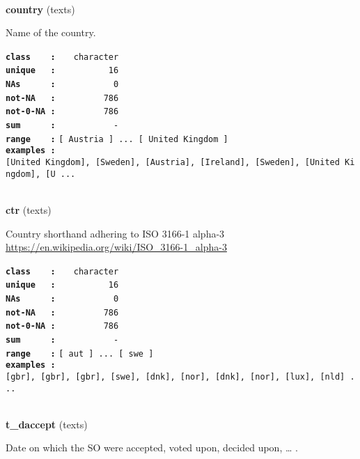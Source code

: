 \documentclass[]{article}
\begin{document}
~

\textbf{country} (texts)

Name of the country.

\textbf{\texttt{class\ \ \ \ :}} \texttt{~~~character}\\
\textbf{\texttt{unique\ \ \ :}} \texttt{~~~~~~~~~~16}\\
\textbf{\texttt{NAs\ \ \ \ \ \ :}} \texttt{~~~~~~~~~~~0}\\
\textbf{\texttt{not-NA\ \ \ :}} \texttt{~~~~~~~~~786}\\
\textbf{\texttt{not-0-NA\ :}} \texttt{~~~~~~~~~786}\\
\textbf{\texttt{sum\ \ \ \ \ \ :}} \texttt{~~~~~~~~~~~-}\\
\textbf{\texttt{range\ \ \ \ :}}
\texttt{{[}\ Austria\ {]}\ ...\ {[}\ United\ Kingdom\ {]}}\\
\textbf{\texttt{examples\ :}}
\texttt{{[}United\ Kingdom{]},\ {[}Sweden{]},\ {[}Austria{]},\ {[}Ireland{]},\ {[}Sweden{]},\ {[}United\ Kingdom{]},\ {[}U\ ...}\\

~

\textbf{ctr} (texts)

Country shorthand adhering to ISO 3166-1 alpha-3
\url{https://en.wikipedia.org/wiki/ISO_3166-1_alpha-3}

\textbf{\texttt{class\ \ \ \ :}} \texttt{~~~character}\\
\textbf{\texttt{unique\ \ \ :}} \texttt{~~~~~~~~~~16}\\
\textbf{\texttt{NAs\ \ \ \ \ \ :}} \texttt{~~~~~~~~~~~0}\\
\textbf{\texttt{not-NA\ \ \ :}} \texttt{~~~~~~~~~786}\\
\textbf{\texttt{not-0-NA\ :}} \texttt{~~~~~~~~~786}\\
\textbf{\texttt{sum\ \ \ \ \ \ :}} \texttt{~~~~~~~~~~~-}\\
\textbf{\texttt{range\ \ \ \ :}}
\texttt{{[}\ aut\ {]}\ ...\ {[}\ swe\ {]}}\\
\textbf{\texttt{examples\ :}}
\texttt{{[}gbr{]},\ {[}gbr{]},\ {[}gbr{]},\ {[}swe{]},\ {[}dnk{]},\ {[}nor{]},\ {[}dnk{]},\ {[}nor{]},\ {[}lux{]},\ {[}nld{]}\ ...}\\

~

\textbf{t\_daccept} (texts)

Date on which the SO were accepted, voted upon, decided upon, \ldots{} .
\end{document}
